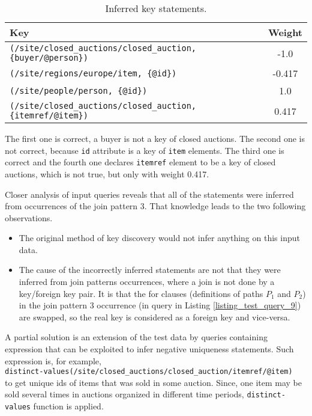 \begin{table}
\begin{tabular}{|l|c|}
\hline
\textbf{Key} & \textbf{Weight} \\ \hline \hline
\texttt{(/site/closed\_auctions/closed\_auction, \{buyer/@person\})} & -1.0 \\ \hline
\texttt{(/site/regions/europe/item, \{@id\})} & -0.417 \\ \hline
\texttt{(/site/people/person, \{@id\})} & 1.0 \\ \hline
\texttt{(/site/closed\_auctions/closed\_auction, \{itemref/@item\})} & 0.417 \\ \hline
\end{tabular}
\caption{Inferred key statements.}
\label{TAB_inferred_keys}
\end{table}

The first one is correct, a buyer is not a key of closed auctions. The second one is not correct, because \texttt{id} attribute is a key of \texttt{item} elements. The third one is correct and the fourth one declares \texttt{itemref} element to be a key of closed auctions, which is not true, but only with weight 0.417.

Closer analysis of input queries reveals that all of the statements were inferred from occurrences of the join pattern 3. That knowledge leads to the two following observations.

\begin{itemize}
\item The original method of key discovery would not infer anything on this input data.
\item The cause of the incorrectly inferred statements are not that they were inferred from join patterns occurrences, where a join is not done by a key/foreign key pair. It is that the for clauses (definitions of paths $P_1$ and $P_2$) in the join pattern 3 occurrence (in query in Listing \ref{listing_test_query_9}) are swapped, so the real key is considered as a foreign key and vice-versa.
\end{itemize}

A partial solution is an extension of the test data by queries containing expression that can be exploited to infer negative uniqueness statements. Such expression is, for example,\\ \texttt{distinct-values(/site/closed\_auctions/closed\_auction/itemref/@item)}\\ to get unique ids of items that was sold in some auction. Since, one item may be sold several times in auctions organized in different time periods, \texttt{distinct-values} function is applied.

